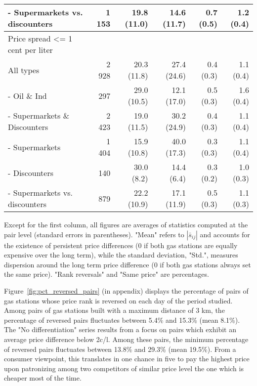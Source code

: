 \documentclass[english]{article}
\begin{document}
\begin{table}
\begin{threeparttable}
\begin{tabular}{lrrrrr}
    \hspace*{4mm} - Supermarkets vs. discounters & 1 153 & 19.8 (11.0) & 14.6 (11.7) & 0.7 (0.5) & 1.2 (0.4) \\
    \midrule
    Price spread <= 1 cent per liter &       &       &       &       &  \\
    All types & 2 928 & 20.3 (11.8) & 27.4 (24.6) & 0.4 (0.3) & 1.1 (0.4) \\
    - Oil \& Ind & 297   & 29.0 (10.5) & 12.1 (17.0) & 0.5 (0.3) & 1.6 (0.4) \\
    - Supermarkets \& Discounters & 2 423 & 19.0 (11.5) & 30.2 (24.9) & 0.4 (0.3) & 1.1 (0.4) \\
    \hspace*{4mm} - Supermarkets & 1 404 & 15.9 (10.8) & 40.0 (17.3) & 0.3 (0.3) & 1.1 (0.4) \\
    \hspace*{4mm} - Discounters & 140   & 30.0 \phantom{0}(8.2) & 14.4 \phantom{0}(6.4) & 0.3 (0.2) & 1.0 (0.3) \\
    \hspace*{4mm} - Supermarkets vs. discounters & 879   & 22.2 (10.9) & 17.1 (11.9) & 0.5 (0.3) & 1.1 (0.3) \\
    \bottomrule
    \bottomrule
\end{tabular}
\begin{tablenotes}
			\small
      \item Except for the first column, all figures are averages of statistics computed at the pair level (standard errors in parentheses). "Mean" refers to $|\bar{s}_{ij}|$ and accounts for the existence of persistent price differences (0 if both gas stations are equally expensive over the long term), while the standard deviation, "Std.", measures dispersion around the long term price difference (0 if both gas stations always set the same price). "Rank reversals" and "Same price" are percentages.
\end{tablenotes}
\end{threeparttable}
\end{table}

Figure~\ref{fig:pct_reversed_pairs} (in appendix) displays the percentage of pairs of gas stations whose price rank is reversed on each day of the period studied. Among pairs of gas stations built with a maximum distance of 3 km, the percentage of reversed pairs fluctuates between 5.4\% and 15.3\%  (mean 8.1\%). The "No differentiation" series results from a focus on pairs which exhibit an average price difference below 2c/l. Among these pairs, the minimum percentage of reversed pairs fluctuates between 13.8\% and 29.3\% (mean 19.5\%). From a consumer viewpoint, this translates in one chance in five to pay the highest price upon patronizing among two competitors of similar price level the one which is cheaper most of the time.
\end{document}
